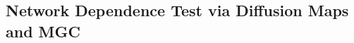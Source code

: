 \documentclass[simplex.tex]{subfiles}
\begin{document}
\subsection{Network Dependence Test via Diffusion Maps and MGC} 
%
%
%
%
\end{document}
